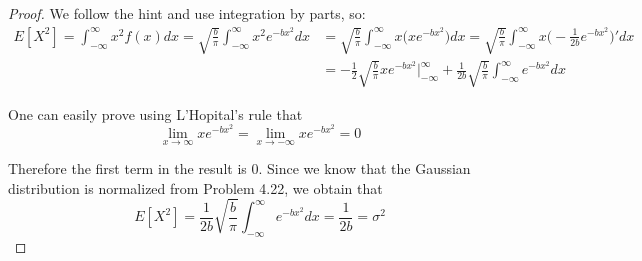 \vspace{1em}

\begin{proof}
    We follow the hint and use integration by parts, so:
    \begin{align*}
        E[X^2] 
        = \int_{-\infty}^\infty x^2 f(x) dx 
        = \sqrt{\frac{b}{\pi}} \int_{-\infty}^\infty x^2 e^{-bx^2} dx
        &= \sqrt{\frac{b}{\pi}} \int_{-\infty}^\infty x \big(xe^{-bx^2}\big) dx
        = \sqrt{\frac{b}{\pi}} \int_{-\infty}^\infty x \bigg(-\frac{1}{2b}e^{-bx^2}\bigg)' dx \\
        &= -\frac{1}{2} \sqrt{\frac{b}{\pi}} xe^{-bx^2} \bigg|_{-\infty}^\infty 
            + \frac{1}{2b} \sqrt{\frac{b}{\pi}} \int_{-\infty}^\infty e^{-bx^2} dx
    \end{align*}

    One can easily prove using L'Hopital's rule that 
    \[
        \lim_{x \to \infty} xe^{-bx^2} = \lim_{x \to -\infty} xe^{-bx^2} = 0
    \] 

    Therefore the first term in the result is 0. Since we know that
    the Gaussian distribution is normalized from Problem 4.22, we obtain that
    \[
        E[X^2] = \frac{1}{2b} \sqrt{\frac{b}{\pi}} \int_{-\infty}^\infty e^{-bx^2} dx 
        = \frac{1}{2b} 
        = \sigma^2
    \] 
\end{proof}
